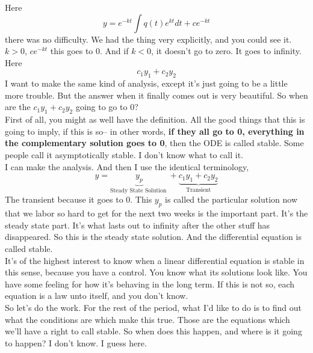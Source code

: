 Here
\begin{equation*}
  y = e^{-kt} \int q(t) e^{kt}dt + c e^{-kt}
\end{equation*}
there was no difficulty. We had the thing very explicitly,
and you could see it.
$k > 0$, $c e^{-kt}$ this goes to $0$.
And if $k < 0$, it doesn't go to zero. It goes to infinity. \\
Here
\begin{equation*}
  c_1 y_ 1 + c_ 2 y_ 2 
\end{equation*}
I want to make the same kind of analysis, except it's just going to be a little more trouble.
But the answer when it finally comes out is very beautiful.
So when are the $c_1 y_ 1 + c_ 2 y_ 2$ going to go to $0$?\\
First of all, you might as well have the definition.
All the good things that this is going to imply, if this is so--
in other words, \textbf{if they all go to 0,
everything in the complementary solution goes to 0}, then the ODE is called stable.
Some people call it asymptotically stable. I don't know what to call it.\\

I can make the analysis.
And then I use the identical terminology,
\begin{equation*}
  y = \underbrace{y_ p}_{\text{Steady State Solution }} +
  \underbrace{c_1 y_ 1 + c_ 2 y_ 2}_{\text{Transient}}
\end{equation*}
The transient because it goes to $0$.
This $y_ p$ is called the particular solution now that we labor so hard to get for
the next two weeks is the important part. It's the steady state part.
It's what lasts out to infinity after the other stuff has disappeared.
So this is the steady state solution.
And the differential equation is called stable. \\
It's of the highest interest to know when a linear differential
equation is stable in this sense, because you have a control.
You know what its solutions look like.
You have some feeling for how it's behaving in the long term.
If this is not so, each equation is a law unto itself, and you don't know. \\

So let's do the work.
For the rest of the period, what I'd like to do is to find out what the conditions are
which make this true.
Those are the equations which we'll have a right to call stable.
So when does this happen, and where is it going to happen?
I don't know. I guess here.\\



